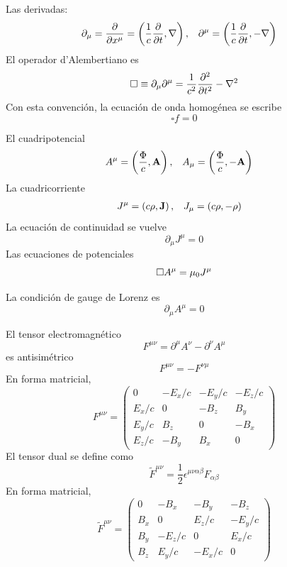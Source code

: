 \documentclass[]{article}
\numberwithin{equation}{section}
\begin{document}
Las derivadas:
\begin{align}
	\partial_\mu &= \dfrac{\partial }{\partial x^\mu} = \left(\frac{1}{c}\dfrac{\partial }{\partial t}, \nabla\right), & \partial^\mu &= \left(\frac{1}{c}\dfrac{\partial }{\partial t}, -\nabla\right)
\end{align}
El operador d'Alembertiano es
\begin{equation}
	\square \equiv \partial_\mu\partial^\mu = \frac{1}{c^2} \dfrac{\partial ^2}{\partial t^2} - \nabla^2
\end{equation}
Con esta convención, la ecuación de onda homogénea se escribe
\begin{equation}
	\square f = 0
\end{equation}

El cuadripotencial 
\begin{align}
	A^\mu &= \left(\frac{\Phi}{c}, \mathbf{A}\right), & A_\mu &= \left(\frac{\Phi}{c}, -\mathbf{A}\right)
\end{align}
La cuadricorriente
\begin{align}
	J^\mu &= \left(c\rho, \mathbf{J}\right), & J_\mu &= \left(c\rho, -\rho\right)
\end{align}
La ecuación de continuidad se vuelve
\begin{equation}
	\partial_\mu J^\mu = 0
\end{equation}
Las ecuaciones de potenciales
\begin{equation}
	\square A^\mu = \mu_{0} J^\mu
\end{equation}

La condición de gauge de Lorenz es
\begin{equation}
	\partial_\mu A^\mu = 0
\end{equation}

El tensor electromagnético
\begin{equation}
	F^{\mu\nu} = \partial^\mu A^\nu - \partial^\nu A^\mu
\end{equation}
es antisimétrico
\begin{equation}
	F^{\mu\nu} = -F^{\nu\mu}
\end{equation}
En forma matricial,
\begin{equation}
	F^{\mu\nu} = \begin{pmatrix}
		0 & -E_x/c & -E_y/c & -E_z/c\\
		E_x/c & 0 & -B_z & B_y\\
		E_y/c & B_z & 0 & -B_x\\
		E_z/c & -B_y & B_x & 0
	\end{pmatrix}
\end{equation}
El tensor dual se define como
\begin{equation}
	\tilde{F}^{\mu\nu} = \frac{1}{2} \epsilon^{\mu\nu\alpha\beta} F_{\alpha\beta}
\end{equation}
En forma matricial,
\begin{equation}
	\tilde{F}^{\mu\nu} = \begin{pmatrix}
		0 & -B_x & -B_y & -B_z\\
		B_x & 0 & E_z/c & -E_y/c\\
		B_y & -E_z/c & 0 & E_x/c\\
		B_z & E_y/c & -E_x/c & 0
	\end{pmatrix}
\end{equation}
\end{document}
